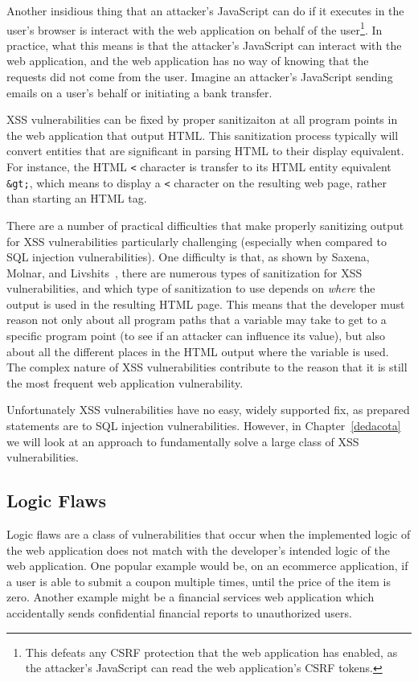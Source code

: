 Another insidious thing that an attacker's JavaScript can do if it
executes in the user's browser is interact with the web application on
behalf of the user\footnote{This defeats any CSRF protection that the
  web application has enabled, as the attacker's JavaScript can read
  the web application's CSRF tokens.}. In practice, what this means is
that the attacker's JavaScript can interact with the web application,
and the web application has no way of knowing that the requests did
not come from the user. Imagine an attacker's JavaScript sending
emails on a user's behalf or initiating a bank transfer.

XSS vulnerabilities can be fixed by proper sanitizaiton at all program
points in the web application that output HTML. This sanitization
process typically will convert entities that are significant in
parsing HTML to their display equivalent. For instance, the HTML
\texttt{<} character is transfer to its HTML entity equivalent
\texttt{\&gt;}, which means to display a \texttt{<} character on the
resulting web page, rather than starting an HTML tag.

There are a number of practical difficulties that make properly
sanitizing output for XSS vulnerabilities particularly challenging
(especially when compared to SQL injection vulnerabilities). One
difficulty is that, as shown by Saxena, Molnar, and
Livshits~\cite{saxena11:scriptgard}, there are numerous types of
sanitization for XSS vulnerabilities, and which type of sanitization
to use depends on \emph{where} the output is used in the resulting
HTML page. This means that the developer must reason not only about
all program paths that a variable may take to get to a specific
program point (to see if an attacker can influence its value), but
also about all the different places in the HTML output where the
variable is used. The complex nature of XSS vulnerabilities contribute
to the reason that it is still the most frequent web application
vulnerability.

Unfortunately XSS vulnerabilities have no easy, widely supported fix,
as prepared statements are to SQL injection vulnerabilities. However,
in Chapter~\ref{dedacota} we will look at an approach to fundamentally
solve a large class of XSS vulnerabilities.

\subsection{Logic Flaws}

Logic flaws are a class of vulnerabilities that occur when the
implemented logic of the web application does not match with the
developer's intended logic of the web application. One popular example
would be, on an ecommerce application, if a user is able to submit a
coupon multiple times, until the price of the item is zero. Another
example might be a financial services web application which
accidentally sends confidential financial reports to unauthorized
users. 

